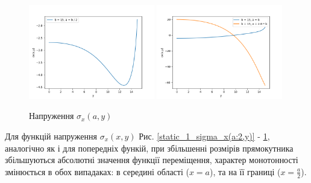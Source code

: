 \begin{figure}[h!]
    \begin{center}
        \includegraphics[width=0.49\textwidth, scale=1]{images/results/static_1/sigma_x(a,y)1.png}
        \includegraphics[width=0.49\textwidth, scale=1]{images/results/static_1/sigma_x(a,y)2.png}
        \caption{Напруження $\sigma_x(a, y)$}\label{static_1_sigma_x(a,y)}
    \end{center}
\end{figure}

Для функцій напруження $\sigma_x(x, y)$ Рис. \ref{static_1_sigma_x(a:2,y)} - \ref{static_1_sigma_x(a,y)},
аналогічно як і для попередніх функій,
при збільшенні розмірів прямокутника збільшуються абсолютні значення функції переміщення,
характер монотонності змінюється в обох випадаках: в середині області ($x=a$), та на її границі ($x=\frac{a}{2}$).

